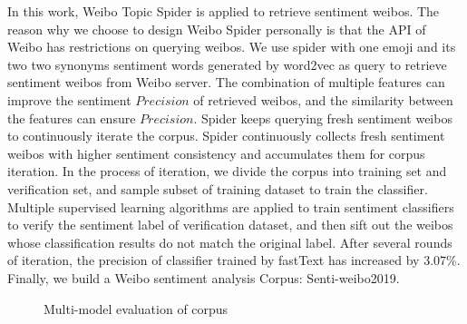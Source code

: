 \documentclass[runningheads]{llncs}
\begin{document}
In this work, Weibo Topic Spider is applied to retrieve sentiment weibos. The reason why we choose to design Weibo Spider personally is that the API of Weibo has restrictions on querying weibos. We use spider with one emoji and its two two synonyms sentiment words generated by word2vec as query to retrieve sentiment weibos from Weibo server. The combination of multiple features can improve the sentiment $Precision$ of retrieved weibos, and the similarity between the features can ensure $Precision$. Spider keeps querying fresh sentiment weibos to continuously iterate the corpus. Spider continuously collects fresh sentiment weibos with higher sentiment consistency and accumulates them for corpus iteration. In the process of iteration, we divide the corpus into training set and verification set, and sample subset of training dataset to train the classifier. Multiple supervised learning algorithms are applied to train sentiment classifiers to verify the sentiment label of verification dataset, and then sift out the weibos whose classification results do not match the original label. After several rounds of iteration, the precision of classifier trained by fastText has increased by 3.07\%. Finally, we build a Weibo sentiment analysis Corpus: Senti-weibo2019. 

\begin{figure}[ht]
\vspace{-0.5cm}   %
\centering  
{}
\caption{Multi-model evaluation of corpus}
\label{fig:corpus-evaluation}
\end{figure}
\end{document}

